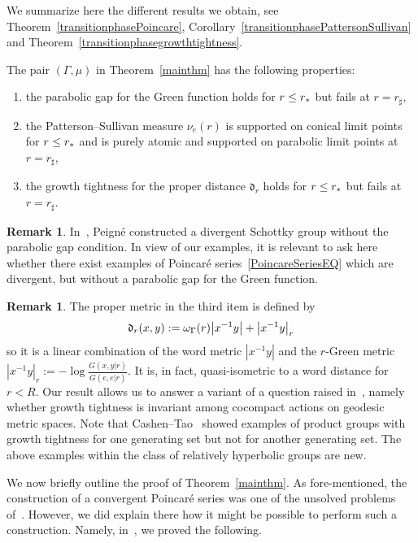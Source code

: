 \documentclass[10pt]{amsart}
\theoremstyle{definition}\newtheorem{defi}[theo]{Definition}\newtheorem{rema}[theo]{Remark}\newtheorem{exam}[theo]{Example}\newtheorem{exem}[theo]{Example}\newtheorem{nota}[theo]{Notation}
\newcommand{\fkd}{\mathfrak{d}}
\let\originalleft\left
\let\originalright\right
\renewcommand{\left}{\mathopen{}\mathclose\bgroup\originalleft}
\renewcommand{\right}{\aftergroup\egroup\originalright}
\let\oldle\le
\renewcommand{\le}{\mathchoice{\oldle}{\oldle}{\,\oldle\,}{\,\oldle\,}}
\begin{document}
We summarize here the different results we obtain, see Theorem~\ref{transitionphasePoincare}, Corollary~\ref{transitionphasePattersonSullivan} and Theorem~\ref{transitionphasegrowthtightness}.
\begin{coro}\label{transitionphaseCor}
The pair $(\Gamma,\mu)$ in Theorem~\ref{mainthm} has the following properties:
\begin{enumerate}
\item\label{coro1.3.1} the parabolic gap for the Green function holds for $r\le r_*$ but fails at $r=r_\sharp$,
\item\label{coro1.3.2} the Patterson--Sullivan measure $\nu_e(r)$ is supported on conical limit points for $r\le r_*$ and is purely atomic and supported on parabolic limit points at $r=r_\sharp$,
\item\label{coro1.3.3} the growth tightness for the proper distance $\fkd_r$ holds for $r\le r_*$ but fails at $r=r_\sharp$.
\end{enumerate}
\end{coro}


\begin{rema}
In~\cite{Peigne11}, Peigné constructed a divergent Schottky group without the parabolic gap condition. In view of our examples, it is relevant to ask here whether there exist examples of Poincaré series~\eqref{PoincareSeriesEQ} which are divergent, but without a parabolic gap for the Green function.
\end{rema}

\begin{rema}
The proper metric in the third item is defined by
\[
\fkd_r(x,y):=\omega_\Gamma(r)\left|x^{-1}y\right|+\left|x^{-1}y\right|_r
\]
so it is a linear combination of the word metric $|x^{-1}y|$ and the $r$-Green metric $|x^{-1}y|_r:=-\log \frac{G(x,y|r)}{G(e,e|r)}$. It is, in fact, quasi-isometric to a word distance for $r<R$. Our result allows us to answer a variant of a question raised in~\cite{ACT}, namely whether growth tightness is invariant among cocompact actions on geodesic metric spaces. Note that Cashen--Tao~\cite{CaTao16} showed examples of product groups with growth tightness for one generating set but not for another generating set. The above examples within the class of relatively hyperbolic groups are new.
\end{rema}


We now briefly outline the proof of Theorem~\ref{mainthm}. As fore-mentioned, the construction of a convergent Poincaré series was one of the unsolved problems of~\cite{DWY}. However, we did explain there how it might be possible to perform such a construction. Namely, in~\cite[Example~C]{DWY}, we proved the following.
\end{document}
